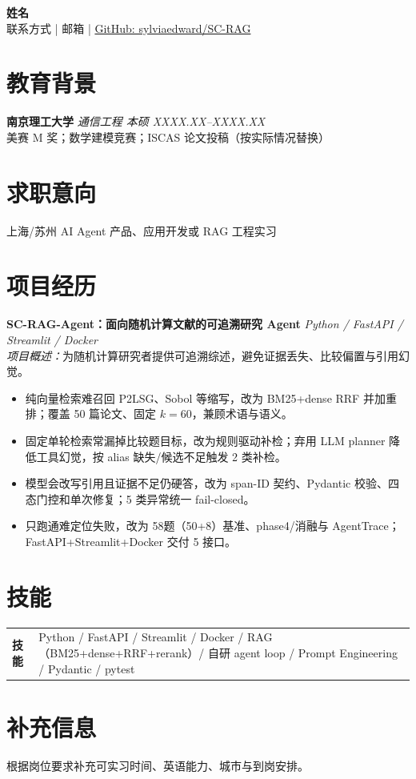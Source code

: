 \documentclass[UTF8,a4paper,10.5pt]{ctexart}
\begin{document}
\begin{center}
{\LARGE\bfseries 姓名}\\[3pt]
联系方式 \quad | \quad 邮箱 \quad | \quad
\href{https://github.com/sylviaedward/SC-RAG}{GitHub: sylviaedward/SC-RAG}
\end{center}

\section{教育背景}
\textbf{南京理工大学} \hfill \textit{通信工程 本硕 \quad XXXX.XX--XXXX.XX}\\
美赛 M 奖；数学建模竞赛；ISCAS 论文投稿（按实际情况替换）

\section{求职意向}
上海/苏州 AI Agent 产品、应用开发或 RAG 工程实习

\section{项目经历}
\textbf{SC-RAG-Agent：面向随机计算文献的可追溯研究 Agent}
\hfill \textit{Python / FastAPI / Streamlit / Docker}\\
\textit{项目概述：}为随机计算研究者提供可追溯综述，避免证据丢失、比较偏置与引用幻觉。

\begin{itemize}
\item 纯向量检索难召回 P2LSG、Sobol 等缩写，改为 BM25+dense RRF 并加重排；覆盖 50 篇论文、固定 $k=60$，兼顾术语与语义。
\item 固定单轮检索常漏掉比较题目标，改为规则驱动补检；弃用 LLM planner 降低工具幻觉，按 alias 缺失/候选不足触发 2 类补检。
\item 模型会改写引用且证据不足仍硬答，改为 span-ID 契约、Pydantic 校验、四态门控和单次修复；5 类异常统一 fail-closed。
\item 只跑通难定位失败，改为 58题（50+8）基准、phase4/消融与 AgentTrace；FastAPI+Streamlit+Docker 交付 5 接口。
\end{itemize}

\section{技能}
\begin{tabularx}{\textwidth}{@{}>{\bfseries}p{2.4cm}X@{}}
技能 & Python / FastAPI / Streamlit / Docker / RAG（BM25+dense+RRF+rerank）/ 自研 agent loop / Prompt Engineering / Pydantic / pytest\\
\end{tabularx}

\section{补充信息}
根据岗位要求补充可实习时间、英语能力、城市与到岗安排。
\end{document}
